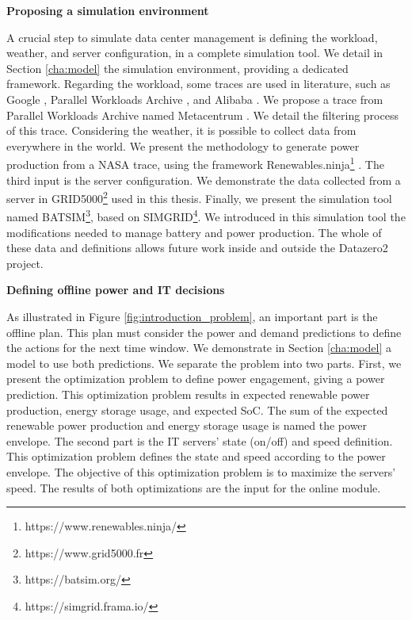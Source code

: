 \begin{center}
    \textbf{Proposing a simulation environment}
\end{center}
A crucial step to simulate data center management is defining the workload, weather, and server configuration, in a complete simulation tool. We detail in Section \ref{cha:model} the simulation environment, providing a dedicated framework. Regarding the workload, some traces are used in literature, such as Google \cite{reiss2011google}, Parallel Workloads Archive \cite{feitelson2014experience}, and Alibaba \cite{wang2022characterizing}. We propose a trace from Parallel Workloads Archive named Metacentrum \cite{klusavcek2017real}. We detail the filtering process of this trace. Considering the weather, it is possible to collect data from everywhere in the world. We present the methodology to generate power production from a NASA trace, using the framework Renewables.ninja\footnote{https://www.renewables.ninja/} \cite{pfenninger2016long}. The third input is the server configuration. We demonstrate the data collected from a server in GRID5000\footnote{https://www.grid5000.fr} used in this thesis. Finally, we present the simulation tool named BATSIM\footnote{https://batsim.org/}, based on SIMGRID\footnote{https://simgrid.frama.io/}. We introduced in this simulation tool the modifications needed to manage battery and power production. The whole of these data and definitions allows future work inside and outside the Datazero2 project.

\begin{center}
    \textbf{Defining offline power and IT decisions}
\end{center}
As illustrated in Figure \ref{fig:introduction_problem}, an important part is the offline plan. This plan must consider the power and demand predictions to define the actions for the next time window. We demonstrate in Section \ref{cha:model} a model to use both predictions. We separate the problem into two parts. First, we present the optimization problem to define power engagement, giving a power prediction. This optimization problem results in expected renewable power production, energy storage usage, and expected SoC. The sum of the expected renewable power production and energy storage usage is named the power envelope. The second part is the IT servers' state (on/off) and speed definition. This optimization problem defines the state and speed according to the power envelope. The objective of this optimization problem is to maximize the servers' speed. The results of both optimizations are the input for the online module.

